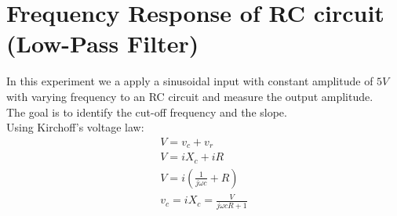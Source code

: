 \documentclass[12pt, a4paper]{article}
\begin{document}
\section{Frequency Response of RC circuit (Low-Pass Filter)}
In this experiment we a apply a sinusoidal input with constant amplitude of $5V$ with varying frequency to an RC circuit and measure the output amplitude.\\
The goal is to identify the cut-off frequency and the slope.\\
Using Kirchoff's voltage law:
\begin{align}
    V=v_c+v_r \\
    V=iX_c+iR  \\
    V=i(\frac{1}{j\omega c}+R) \\
    v_c=iX_c=\frac{V}{j\omega cR+1}\\
\end{align}
\end{document}
